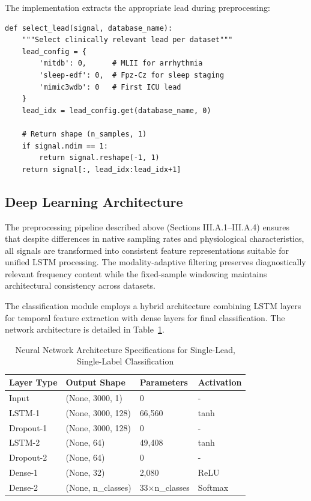 \documentclass[conference]{IEEEtran}
\begin{document}
The implementation extracts the appropriate lead during preprocessing:

\begin{lstlisting}[caption={Single-lead selection implementation},label={lst:lead_select}]
def select_lead(signal, database_name):
    """Select clinically relevant lead per dataset"""
    lead_config = {
        'mitdb': 0,      # MLII for arrhythmia
        'sleep-edf': 0,  # Fpz-Cz for sleep staging
        'mimic3wdb': 0   # First ICU lead
    }
    lead_idx = lead_config.get(database_name, 0)

    # Return shape (n_samples, 1)
    if signal.ndim == 1:
        return signal.reshape(-1, 1)
    return signal[:, lead_idx:lead_idx+1]
\end{lstlisting}

\subsection{Deep Learning Architecture}

The preprocessing pipeline described above (Sections III.A.1--III.A.4) ensures that despite differences in native sampling rates and physiological characteristics, all signals are transformed into consistent feature representations suitable for unified LSTM processing. The modality-adaptive filtering preserves diagnostically relevant frequency content while the fixed-sample windowing maintains architectural consistency across datasets.

The classification module employs a hybrid architecture combining LSTM layers for temporal feature extraction with dense layers for final classification. The network architecture is detailed in Table~\ref{tab:architecture}.

\begin{table}[htbp]
\caption{Neural Network Architecture Specifications for Single-Lead, Single-Label Classification}
\label{tab:architecture}
\centering
\begin{tabular}{llll}
\toprule
Layer Type & Output Shape & Parameters & Activation \\
\midrule
Input & (None, 3000, 1) & 0 & - \\
LSTM-1 & (None, 3000, 128) & 66,560 & tanh \\
Dropout-1 & (None, 3000, 128) & 0 & - \\
LSTM-2 & (None, 64) & 49,408 & tanh \\
Dropout-2 & (None, 64) & 0 & - \\
Dense-1 & (None, 32) & 2,080 & ReLU \\
Dense-2 & (None, n\_classes) & 33×n\_classes & Softmax \\
\bottomrule
\end{tabular}
\end{table}
\end{document}
